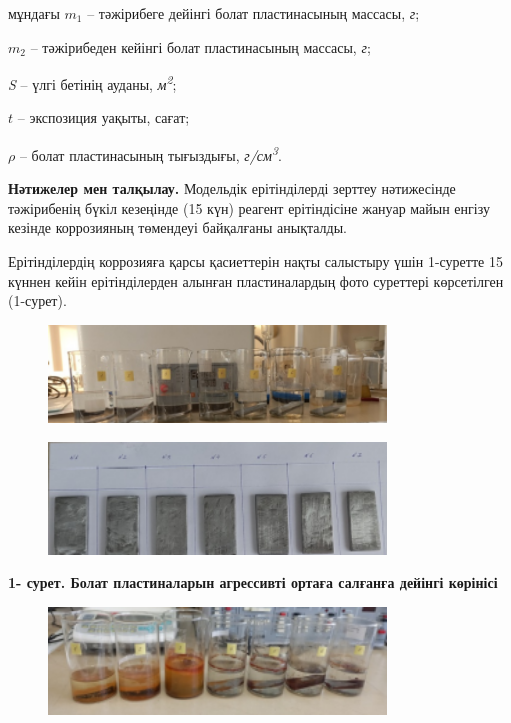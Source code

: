 мұндағы \(m_{1}\) -- тәжірибеге дейінгі болат пластинасының массасы,
\emph{г};

\(m_{2}\) -- тәжірибеден кейінгі болат пластинасының массасы, \emph{г};

\emph{S} -- үлгі бетінің ауданы, \emph{м\textsuperscript{2}};

\(t\) -- экспозиция уақыты, сағат;

\(\rho\) -- болат пластинасының тығыздығы,
\emph{г/см\textsuperscript{3}}.

{\bfseries Нәтижелер мен талқылау.} Модельдік ерітінділерді зерттеу
нәтижесінде тәжірибенің бүкіл кезеңінде (15 күн) реагент ерітіндісіне
жануар майын енгізу кезінде коррозияның төмендеуі байқалғаны анықталды.

Ерітінділердің коррозияға қарсы қасиеттерін нақты салыстыру үшін
1-суретте 15 күннен кейін ерітінділерден алынған пластиналардың фото
суреттері көрсетілген (1-сурет).

\begin{figure}[H]
	\centering
	\includegraphics[width=0.8\textwidth]{media/gor/image22}
	\caption*{}
\end{figure}


\begin{figure}[H]
	\centering
	\includegraphics[width=0.8\textwidth]{media/gor/image23}
	\caption*{}
\end{figure}


{\bfseries 1- сурет. Болат пластиналарын агрессивті ортаға салғанға дейінгі
көрінісі}

\begin{figure}[H]
	\centering
	\includegraphics[width=0.8\textwidth]{media/gor/image24}
	\caption*{}
\end{figure}


